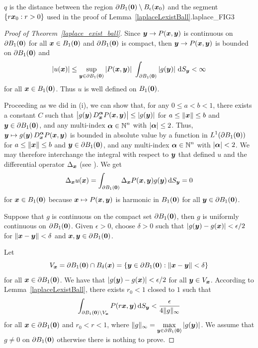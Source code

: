 {$q$ is the distance between the region
$\partial B_1({\bm{0}}) \setminus B_\epsilon({\bm{x}}_0)$ and the segment
$\{ r{\bm{x}}_0 : r >0 \}$ used in the proof of
Lemma~\ref{laplaceLexistBall}.}{laplace_FIG3}

\begin{proof}[Proof of Theorem~\ref{laplace_exist_ball}]
 Since ${\bm{y}} \rightarrow P({\bm{x}},{\bm{y}})$ is continuous
on $\partial B_1({\bm{0}})$ for all ${\bm{x}} \in B_1({\bm{0}})$ and
$\partial B_1({\bm{0}})$ is compact, then
${\bm{y}} \rightarrow P({\bm{x}},{\bm{y}})$ is bounded on
$\partial B_1({\bm{0}})$ and
\[
\left| u(\VEC{x}) \right| \leq \sup_{\VEC{y} \in \partial B_1(\VEC{0})}
\left| P(\VEC{x},\VEC{y}) \right| \ 
\int_{\partial B_1(\VEC{0})} \left| g(\VEC{y}) \right| \dss{S}{y}
< \infty
\]
for all ${\bm{x}} \in B_1({\bm{0}})$.
Thus $u$ is well defined on $B_1({\bm{0}})$.

 Proceeding as we did in (i), we can show that, for any
$0\leq a < b <1$, there exists a constant $C$ such that 
$\displaystyle \big|g({\bm{y}})\,
D^{{\bm{\alpha}}}_{{\bm{x}}} P({\bm{x}},{\bm{y}})\big|
\leq |g({\bm{y}})|$ for $a \leq \|{\bm{x}} \| \leq b$ and
${\bm{y}} \in \partial B_1({\bm{0}})$, and any multi-index
$\displaystyle {\bm{\alpha}} \in \mathbb{N}^n$ with $|{\bm{\alpha}}|\leq 2$.  Thus,
$\displaystyle {\bm{y}} \mapsto g({\bm{y}})\, D^{{\bm{\alpha}}}_{{\bm{x}}}
P({\bm{x}},{\bm{y}})$
is bounded in absolute value by a function in
$\displaystyle L^1(\partial B_1({\bm{0}}))$ for
$a \leq \|{\bm{x}} \| \leq b$ and
${\bm{y}} \in \partial B_1({\bm{0}})$, and any multi-index
$\displaystyle {\bm{\alpha}} \in \mathbb{N}^n$ with $|{\bm{\alpha}}|<2$.  
We may therefore interchange the integral with respect to ${\bm{y}}$
that defined $u$ and the differential operator $\Delta_{{\bm{x}}}$
(see \cite{Flem}).  We get
\[
\Delta_{{\bm{x}}} u({\bm{x}}) = \int_{\partial B_1({\bm{0}})}
\Delta_{{\bm{x}}}P({\bm{x}},{\bm{y}}) g({\bm{y}}) \,\mathrm{d}{S}_{{\bm{y}}} = 0
\]
for ${\bm{x}} \in B_1({\bm{0}})$
because ${\bm{x}} \mapsto P({\bm{x}},{\bm{y}})$ is harmonic in
$B_1({\bm{0}})$ for all ${\bm{y}} \in \partial B_1({\bm{0}})$.

 Suppose that $g$ is continuous on the compact set
$\partial B_1({\bm{0}})$, then $g$ is uniformly continuous on
$\partial B_1({\bm{0}})$.  Given $\epsilon>0$, choose $\delta>0$ such
that
$\displaystyle |g({\bm{y}}) - g({\bm{x}})| < \epsilon/2$ for
$\|{\bm{x}}-{\bm{y}}\| < \delta$ and
${\bm{x}},{\bm{y}} \in \partial B_1({\bm{0}})$.

Let
\[
V_{{\bm{x}}} = \partial B_1({\bm{0}}) \cap B_\delta({\bm{x}})
= \left\{ {\bm{y}} \in \partial B_1({\bm{0}})
: \|{\bm{x}} - {\bm{y}} \| < \delta \right\}
\]
for all ${\bm{x}} \in \partial B_1({\bm{0}})$.  We have that
$\displaystyle |g({\bm{y}}) - g({\bm{x}})| < \epsilon/2$ for all
${\bm{y}} \in V_{{\bm{x}}}$.
According to Lemma~\ref{laplaceLexistBall}, there exists $r_0<1$
closed to $1$ such that
\[
\int_{\partial B_1({\bm{0}})\setminus V_{{\bm{x}}}}
P(r{\bm{x}},{\bm{y}}) \,\mathrm{d}{S}_{{\bm{y}}} < \frac{\epsilon}{4\|g\|_\infty}
\]
for all ${\bm{x}} \in \partial B_1({\bm{0}})$ and $r_0 < r < 1$, where
$\displaystyle \|g\|_{\infty} = \max_{{\bm{y}}\in\partial B_1({\bm{0}})}
|g({\bm{y}})|$.
We assume that $g \neq 0$ on $\partial B_1({\bm{0}})$ otherwise there
is nothing to prove.


\end{proof}
